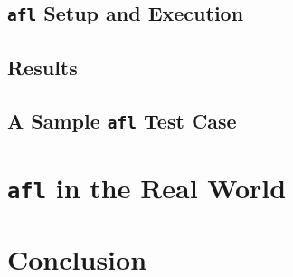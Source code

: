 \subsection{\texttt{afl} Setup and Execution}

\subsection{Results}


\subsection{A Sample \texttt{afl} Test Case}


\section{\texttt{afl} in the Real World}



\section{Conclusion}

